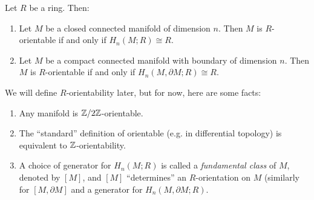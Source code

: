 \begin{theorem}
  Let $R$ be a ring. Then:
  \begin{enumerate}
    \item Let $M$ be a closed connected
      manifold of dimension $n$. Then
      $M$ is $R$-orientable if and only if
      $H_n(M; R) \cong R$.
    \item Let $M$ be a compact connected
      manifold with boundary of dimension $n$.
      Then $M$ is $R$-orientable if and only
      if $H_n(M, \partial M; R) \cong R$.
  \end{enumerate}
\end{theorem}

\begin{remark}
  We will define $R$-orientability later,
  but for now, here are some facts:
  \begin{enumerate}
    \item Any manifold is $\mathbb{Z} / 2\mathbb{Z}$-orientable.
    \item The ``standard'' definition of
      orientable (e.g. in differential
      topology) is equivalent to
      $\mathbb{Z}$-orientability.
    \item A choice of generator for $H_n(M; R)$
      is called a \emph{fundamental class}
      of $M$, denoted by $[M]$, and $[M]$
      ``determines'' an $R$-orientation on
      $M$ (similarly for $[M, \partial M]$
      and
      a generator for $H_n(M, \partial M; R)$.
  \end{enumerate}
\end{remark}

